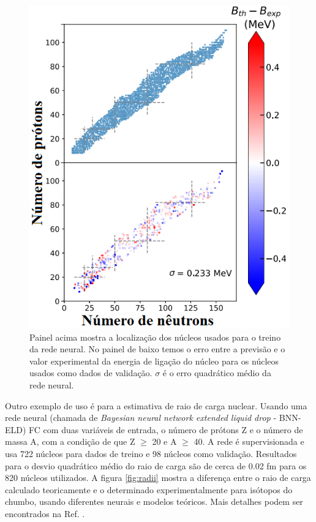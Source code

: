 \documentclass[a4paper,12pt,oneside]{book}
\begin{document}
\begin{figure}[H]
    \centering
    \includegraphics[scale = 0.60]{figs/nuclei_mass.png}
    \caption{Painel acima mostra a localização dos núcleos usados para o treino da rede neural. No painel de baixo temos o erro entre a previsão e o valor experimental da energia de ligação do núcleo para os núcleos usados como dados de validação. $\sigma$ é o erro quadrático médio da rede neural.}
    \label{fig:nuclei_mass_ml}
\end{figure}

\par Outro exemplo de uso é para a estimativa de raio de carga nuclear. Usando uma rede neural (chamada de \textit{Bayesian neural network extended liquid drop} - BNN-ELD) FC com duas variáveis de entrada, o número de prótons Z e o número de massa A, com a condição de que Z $\geq$ 20 e A $\geq$ 40. A rede é supervisionada e usa 722 núcleos para dados de treino e 98 núcleos como validação. Resultados para o desvio quadrático médio do raio de carga são de cerca de 0.02 fm para os 820 núcleos utilizados. A figura \ref{fig:radii} mostra a diferença entre o raio de carga calculado teoricamente e o determinado experimentalmente para isótopos do chumbo, usando diferentes neurais e modelos teóricos. Mais detalhes podem ser encontrados na Ref. \cite{raio_carga}.
\end{document}
